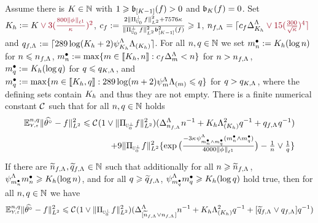 \begin{lm}\label{re:au:ub:co2} Assume there is $K\in\Nz$
  with   $1\geq \bias[{[K-1] }](\xdf)>0$ and $\bias[K](\xdf)=0$. Set
 $K_{\ydf}:=K\dr\vee
3(\tfrac{800\Vnormlp[1]{\fydf}}{\cpen})^2$, $c_{\xdf}:=\tfrac{2\VnormLp{\Proj[{\mHiH[0]}]^\perp\xdf}^2+7576\cpen}{\VnormLp{\Proj[{\mHiH[0]}]^\perp\xdf}^2\bias[{[K-1]}]^2(\xdf)}\geq1$,
$\ssY_{\xdf,\iSv}=\ceil{c_{\xdf}\DipenSv[K_{\ydf}]\dr\vee15(\tfrac{300}{\sqrt{\cpen}})^4}$
and $\ssE_{\xdf,\iSv}:=\ceil{289\log(K_{\ydf}+2)\cmiSv[K_{\ydf}]\miSv[K_{\ydf}]}$.
For  all $\ssY,\ssE\in\Nz$ we set $\sDi{\ssY}:=K_{\ydf}(\log\ssY)$ for
$\ssY\leq\ssY_{\xdf,\iSv}$,
$\sDi{\ssY}:=\max\{\Di\in\nset{K_{\ydf},\ssY}:c_{\xdf}\DipenSv<\ssY\}$ 
for $\ssY>\ssY_{\xdf,\iSv}$, $\sDi{\ssE}:=K_{\ydf}(\log\ssE)$ for
$\ssE\leq\ssE_{K,\iSv}$, and
$\sDi{\ssE}:=\max\{\Di\in\nset{K_{\ydf},\ssE}:289\log(\Di+2)\cmiSv\miSv\leq\ssE\}$ for
$\ssE>\ssE_{K,\iSv}$, where the defining sets contain $K_{\ydf}$
and thus they are not empty.
There is a finite numerical  constant $\cst{}$
such that for all $\ssY,\ssE\in\Nz$ holds
\begin{multline}\label{re:au:ub:co2:e1}
\FuEx[\ssY,\ssE]{\rY,\rE}\VnormLp{\hxdfPr[]-\xdf}^2\leq \cst{}(1\vee\VnormLp{\Proj[{\mHiH[0]^\perp}]\xdf}^2)(\DipenSv[\ssY_{\xdf,\iSv}]\ssY^{-1}+K_{\ydf}\miSv[K_{\ydf}]^2\ssE^{-1}+\ssE_{\xdf,\iSv}\ssE^{-1})\\
\hfill+9
\VnormLp{\Proj[{\mHiH[0]^\perp}]\xdf}^2\{\exp\big(\tfrac{-3\cpen\cmiSv[\sDi{\ssY}\wedge\sDi{\ssE}](\sDi{\ssY}\wedge\sDi{\ssE})}{4000\Vnormlp[1]{\fydf}}\big)-\tfrac{1}{\ssY}\vee\tfrac{1}{\ssE}\}
\end{multline}
If there are
$\widetilde{\ssY}_{\xdf,\iSv},\widetilde{\ssE}_{\xdf,\iSv}\in\Nz$ such
that additionally for all $\ssY\geq\widetilde{\ssY}_{\xdf,\iSv}$,
$\cmiSv[\sDi{\ssY}]\sDi{\ssY}\geq K_{\ydf}(\log\ssY)$, and for all
$\ssE\geq\widetilde{\ssE}_{\xdf,\iSv}$,
$\cmiSv[\sDi{\ssE}]\sDi{\ssE}\geq K_{\ydf}(\log\ssE)$
hold true, then for all $\ssY,\ssE\in\Nz$ we have
\begin{equation}\label{re:au:ub:co2:e2}
\FuEx[\ssY,\ssE]{\rY,\rE}\VnormLp{\hxdfPr[]-\xdf}^2\leq 
\cst{}(1\vee\VnormLp{\Proj[{\mHiH[0]^\perp}]\xdf}^2)(\DipenSv[{[\widetilde{\ssY}_{\xdf,\iSv}\vee\ssY_{\xdf,\iSv}]}]\ssY^{-1}+K_{\ydf}\miSv[K_{\ydf}]^2\ssE^{-1}+[\widetilde{\ssE}_{\xdf,\iSv}\vee\ssE_{\xdf,\iSv}]\ssE^{-1})
\end{equation}
\end{lm}
